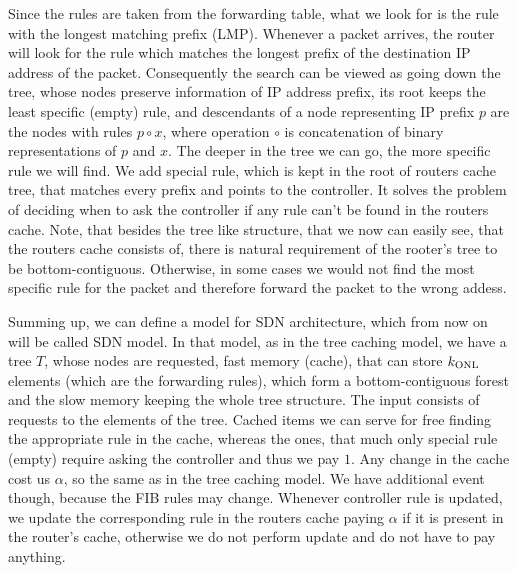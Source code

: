 Since the rules are taken from the forwarding table, what we look for is the
rule with the longest matching prefix (LMP). Whenever a packet arrives, the
router will look for the rule which matches the longest prefix of the
destination IP address of the packet. Consequently the search can be viewed as
going down the tree, whose nodes preserve information of IP address prefix, its
root keeps the least specific (empty) rule, and descendants of a node
representing IP prefix $p$ are the nodes with rules $p \circ x$, where operation
$\circ$ is concatenation of binary representations of $p$ and $x$. The deeper in
the tree we can go, the more specific rule we will find. We add special rule,
which is kept in the root of routers cache tree, that matches every prefix and
points to the controller. It solves the problem of deciding when to ask the
controller if any rule can't be found in the routers cache. Note, that besides
the tree like structure, that we now can easily see, that the routers cache
consists of, there is natural requirement of the rooter's tree to be
bottom-contiguous. Otherwise, in some cases we would not find the most specific
rule for the packet and therefore forward the packet to the wrong addess. 

Summing up, we can define a model for SDN architecture, which from now on will
be called SDN model. In that model, as in the tree caching model, we have a tree
$T$, whose nodes are requested, fast memory (cache), that can store $k_{\mathrm{ONL}}$
elements (which are the forwarding rules), which form a bottom-contiguous forest
and the slow memory keeping the whole tree structure. The input consists of
requests to the elements of the tree. Cached items we can serve for free finding
the appropriate rule in the cache, whereas the ones, that much only special rule
(empty) require asking the controller and thus we pay $1$. Any change in the
cache cost us $\alpha$, so the same as in the tree caching model. We have
additional event though, because the FIB rules may change. Whenever controller
rule is updated, we update the corresponding rule in the routers cache paying
$\alpha$ if it is present in the router's cache, otherwise we do not perform
update and do not have to pay anything.

